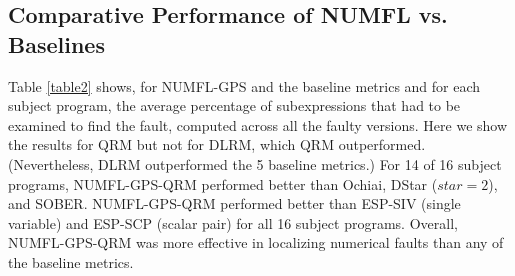 \documentclass[times]{stvrauth}
\begin{document}
\subsection{Comparative Performance of NUMFL vs. Baselines}\label{VD}
Table \ref{table2} shows, for NUMFL-GPS and the baseline metrics and for each subject program, the average percentage of subexpressions that had to be examined to find the fault, computed across all the faulty versions.  Here we show the results for QRM but not for DLRM, which QRM outperformed.  (Nevertheless, DLRM outperformed the 5 baseline metrics.)  For 14 of 16 subject programs, NUMFL-GPS-QRM performed better than Ochiai, DStar ($star=2$), and SOBER. NUMFL-GPS-QRM performed better than ESP-SIV (single variable) and ESP-SCP (scalar pair) for all 16 subject programs.  Overall, NUMFL-GPS-QRM was more effective in localizing numerical faults than any of the baseline metrics.
\end{document}
